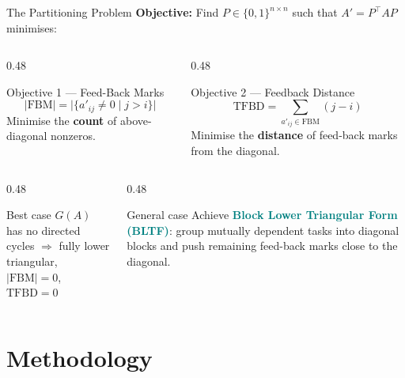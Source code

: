\documentclass[aspectratio=169]{beamer}
\newcommand{\highlight}[1]{\textcolor{teal}{\textbf{#1}}}
\begin{document}
\begin{frame}{The Partitioning Problem}
  \textbf{Objective:} Find $P \in \{0,1\}^{n\times n}$ such that $A' = P^\top A P$ minimises:
  \vspace{0.3em}
  \begin{columns}[T]
    \begin{column}{0.48\textwidth}
      \begin{block}{Objective 1 — Feed-Back Marks}
        \[
          |\text{FBM}| = \bigl|\{a'_{ij} \neq 0 \mid j > i\}\bigr|
        \]
        Minimise the \textbf{count} of above-diagonal nonzeros.
      \end{block}
    \end{column}
    \begin{column}{0.48\textwidth}
      \begin{block}{Objective 2 — Feedback Distance}
        \[
          \text{TFBD} = \sum_{a'_{ij} \in \text{FBM}} (j - i)
        \]
        Minimise the \textbf{distance} of feed-back marks from the diagonal.
      \end{block}
    \end{column}
  \end{columns}
  \vspace{0.5em}
  \begin{columns}[T]
    \begin{column}{0.48\textwidth}
      \begin{alertblock}{Best case}
        $G(A)$ has no directed cycles $\Rightarrow$ fully lower triangular,\\$|\text{FBM}| = 0$, $\text{TFBD} = 0$
      \end{alertblock}
    \end{column}
    \begin{column}{0.48\textwidth}
      \begin{alertblock}{General case}
        Achieve \highlight{Block Lower Triangular Form (BLTF)}: group mutually dependent tasks into diagonal blocks and push remaining feed-back marks close to the diagonal.
      \end{alertblock}
    \end{column}
  \end{columns}
\end{frame}

\section{Methodology}
\end{document}
